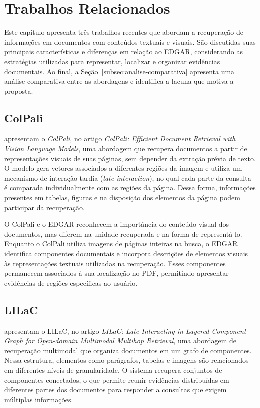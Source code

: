 \chapter{Trabalhos Relacionados}
\label{sec:trabalhos-relacionados}

Este capítulo apresenta três trabalhos recentes que abordam a recuperação de informações em documentos com conteúdos textuais e visuais. São discutidas suas principais características e diferenças em relação ao EDGAR, considerando as estratégias utilizadas para representar, localizar e organizar evidências documentais. Ao final, a Seção~\ref{subsec:analise-comparativa} apresenta uma análise comparativa entre as abordagens e identifica a lacuna que motiva a proposta.

\section{ColPali}
\label{sec:colpali}

 apresentam o \textit{ColPali}, no artigo \textit{ColPali: Efficient Document Retrieval with Vision Language Models}, uma abordagem que recupera documentos a partir de representações visuais de suas páginas, sem depender da extração prévia de texto. O modelo gera vetores associados a diferentes regiões da imagem e utiliza um mecanismo de interação tardia (\textit{late interaction}), no qual cada parte da consulta é comparada individualmente com as regiões da página. Dessa forma, informações presentes em tabelas, figuras e na disposição dos elementos da página podem participar da recuperação.

O ColPali e o EDGAR reconhecem a importância do conteúdo visual dos documentos, mas diferem na unidade recuperada e na forma de representá-lo. Enquanto o ColPali utiliza imagens de páginas inteiras na busca, o EDGAR identifica componentes documentais e incorpora descrições de elementos visuais às representações textuais utilizadas na recuperação. Esses componentes permanecem associados à sua localização no PDF, permitindo apresentar evidências de regiões específicas ao usuário.

\section{LILaC}
\label{sec:lilac}

 apresentam o LILaC, no artigo \textit{LILaC: Late Interacting in Layered Component Graph for Open-domain Multimodal Multihop Retrieval}, uma abordagem de recuperação multimodal que organiza documentos em um grafo de componentes. Nessa estrutura, elementos como parágrafos, tabelas e imagens são relacionados em diferentes níveis de granularidade. O sistema recupera conjuntos de componentes conectados, o que permite reunir evidências distribuídas em diferentes partes dos documentos para responder a consultas que exigem múltiplas informações.

